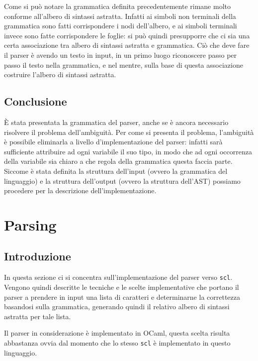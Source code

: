 \documentclass[12pt,a4paper]{report}
\begin{document}
Come si può notare la grammatica definita precedentemente rimane molto
conforme all'albero di sintassi astratta. Infatti ai simboli non
terminali della grammatica sono fatti corrispondere i nodi dell'albero,
e ai simboli terminali invece sono fatte corrispondere le foglie: si può
quindi presupporre che ci sia una certa associazione tra albero di
sintassi astratta e grammatica. Ciò che deve fare il parser è avendo un
testo in input, in un primo luogo riconoscere passo per passo il testo
nella grammatica, e nel mentre, sulla base di questa associazione
costruire l'albero di sintassi astratta.

\hypertarget{conclusione-1}{%
\section{Conclusione}\label{conclusione-1}}

È stata presentata la grammatica del parser, anche se è ancora
necessario risolvere il problema dell'ambiguità. Per come si presenta il
problema, l'ambiguità è possibile eliminarla a livello d'implementazione
del parser: infatti sarà sufficiente attribuire ad ogni variabile il suo
tipo, in modo che ad ogni occorrenza della variabile sia chiaro a che
regola della grammatica questa faccia parte. Siccome è stata definita la
struttura dell'input (ovvero la grammatica del linguaggio) e la
struttura dell'output (ovvero la struttura dell'AST) possiamo procedere
per la descrizione dell'implementazione.

\newpage

\hypertarget{parsing}{%
\chapter{Parsing}\label{parsing}}

\hypertarget{introduzione-3}{%
\section{Introduzione}\label{introduzione-3}}

In questa sezione ci si concentra sull'implementazione del parser verso
\texttt{scl}. Vengono quindi descritte le tecniche e le scelte
implementative che portano il parser a prendere in input una lista di
caratteri e determinarne la correttezza basandosi sulla grammatica,
generando quindi il relativo albero di sintassi astratta per tale lista.

Il parser in considerazione è implementato in OCaml, questa scelta
risulta abbastanza ovvia dal momento che lo stesso \texttt{scl} è
implementato in questo linguaggio.
\end{document}
